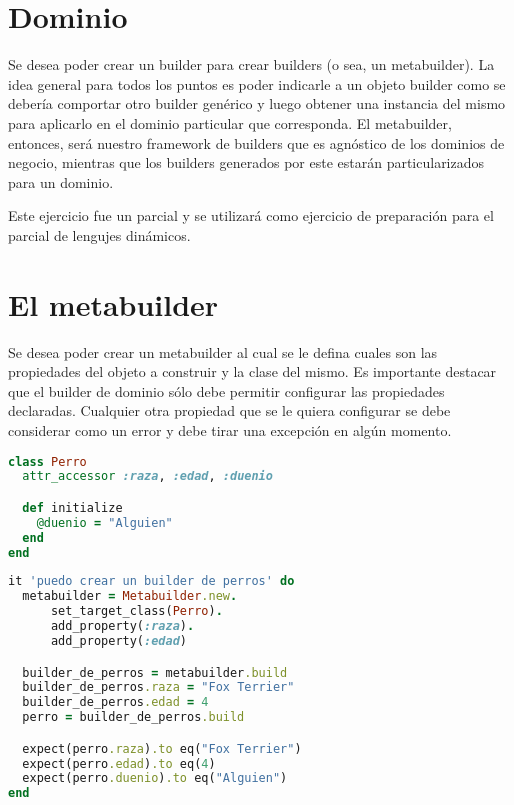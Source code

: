 \documentclass[spanish,a4paper]{article}
\begin{document}
\maketitle

\section*{Dominio}
Se desea poder crear un builder para crear builders (o sea, un metabuilder). La idea general para todos los puntos es poder indicarle a un objeto builder como se debería comportar otro builder genérico y luego obtener una instancia del mismo para aplicarlo en el dominio particular que corresponda.
El metabuilder, entonces, será nuestro framework de builders que es agnóstico de los dominios de negocio, mientras que los builders generados por este estarán particularizados para un dominio.

Este ejercicio fue un parcial y se utilizará como ejercicio de preparación para el parcial de lengujes dinámicos.

\section{El metabuilder}

Se desea poder crear un metabuilder al cual se le defina cuales son las propiedades del objeto a construir y la clase del mismo.
Es importante destacar que el builder de dominio sólo debe permitir configurar las propiedades declaradas. Cualquier otra propiedad que se le quiera configurar se debe considerar como un error y debe tirar una excepción en algún momento.

  \begin{lstlisting}[language=Ruby]
class Perro
  attr_accessor :raza, :edad, :duenio

  def initialize
    @duenio = "Alguien"
  end
end
  \end{lstlisting}
  
  \begin{lstlisting}[language=Ruby]
it 'puedo crear un builder de perros' do
  metabuilder = Metabuilder.new.
      set_target_class(Perro).
      add_property(:raza).
      add_property(:edad)

  builder_de_perros = metabuilder.build
  builder_de_perros.raza = "Fox Terrier"
  builder_de_perros.edad = 4
  perro = builder_de_perros.build

  expect(perro.raza).to eq("Fox Terrier")
  expect(perro.edad).to eq(4)
  expect(perro.duenio).to eq("Alguien")
end
  \end{lstlisting}
\end{document}
